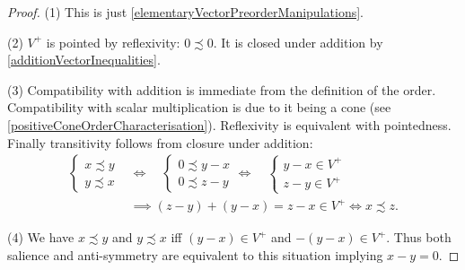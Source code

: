 \begin{proof}
(1) This is just \ref{elementaryVectorPreorderManipulations}.

(2) $V^+$  is pointed by reflexivity: $0\precsim 0$. It is closed under addition by \ref{additionVectorInequalities}.

(3) Compatibility with addition is immediate from the definition of the order. Compatibility with scalar multiplication is due to it being a cone (see \ref{positiveConeOrderCharacterisation}). Reflexivity is equivalent with pointedness. Finally transitivity follows from closure under addition:
\begin{align*}
 \begin{cases}
x\precsim y \\ y\precsim x
\end{cases} &\iff \quad \begin{cases}
0 \precsim y -x \\ 0 \precsim z-y
\end{cases} \iff\quad \begin{cases}
y-x \in V^+ \\ z-y \in V^+
\end{cases} \\
&\implies (z-y)+(y-x) = z-x \in V^+ \iff x \precsim z. 
\end{align*}

(4) We have $x\precsim y$ and $y\precsim x$ iff $(y-x) \in V^+$ and $-(y-x) \in V^+$. Thus both salience and anti-symmetry are equivalent to this situation implying $x-y = 0$.
\end{proof}


